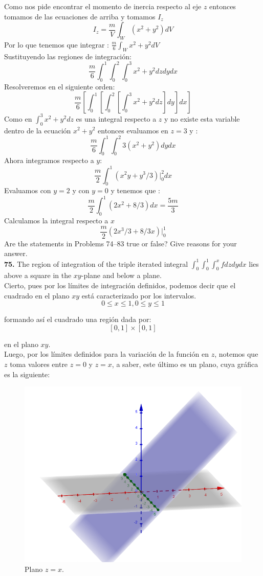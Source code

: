 \documentclass[11pt]{report}
\begin{document}
Como nos  pide encontrar el momento de inercia respecto al eje $z$ entonces tomamos de las ecuaciones de arriba y tomamos $I_z$
\[I_{z} = \frac{m}{V} \int_W (x^2+y^2) dV\]
Por lo que tenemos que integrar : $\frac{m}{6} \int_W x^2+ y^2 dV$\\
Sustituyendo las regiones de integración:
\[\frac{m}{6} \int_0^1 \int_0^2 \int_0^3 x^2 + y^2 dz dy dx\]
Resolveremos en el siguiente orden:
\[\frac{m}{6} \left[ \int_0^1\left[ \int_0^2\left[ \int_0^3 x^2 + y^2 dz \right] dy \right] dx \right] \]
Como en $\int_0 ^3 x^2+ y^2 dz$ es una integral respecto a $z$ y no existe esta variable dentro
de la ecuación $x^2+ y^2$ entonces evaluamos en $z = 3$ y :
\[\frac{m}{6} \int_0^1 \int_0^2 3\left( x^2+y^2 \right) dy dx\]
Ahora integramos respecto a $y$:
\[\frac{m}{2} \int_0^1 \left( x^2y+ y^3/3 \right) \vert_0^2 dx\]
Evaluamos con $y= 2$ y con $y= 0$ y tenemos que :
\[\frac{m}{2} \int_0^1 \left( 2x^2+ 8/3 \right) dx = \frac{5m}{3}\]
Calculamos la integral respecto a $x$
\[\frac{m}{2} \left( 2x^3/3 + 8/3 x \right) \vert_0^1\]
Are the statements in Problems 74–83 true or false? Give reasons for your answer. \\

\textbf{75.} The region of integration of the triple iterated integral
$\int_0^1 \int_0^1 \int_0^x f dz dy dx $ lies above a square in the $xy$-plane
and below a plane. \\

Cierto, pues por los límites de integración definidos, podemos decir que el
cuadrado en el plano $xy$ está caracterizado por los intervalos.
	$$ 0 \leq x \leq 1, 0 \leq y \leq 1 $$

formando así el cuadrado una región dada por:
	$$ [0,1] \times [0,1] $$

en el plano $xy$.\\

Luego, por los límites definidos para la variación de la función en $z$, notemos
que $z$ toma valores entre $z = 0$ y $z = x$, a saber, este último es un plano,
cuya gráfica es la siguiente:

\begin{figure}[H]
	\includegraphics[scale=0.3]{plane.png}
	\centering
	\caption{Plano $z = x$.}
	\centering
\end{figure}
\end{document}
